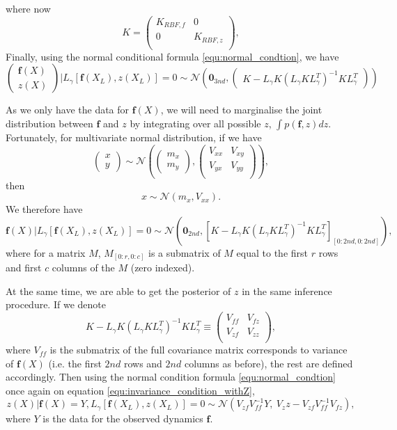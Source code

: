 \documentclass{statsmsc}
\begin{document}
where now 
$$
K = \begin{pmatrix}
  K_{RBF, f} & 0 \\
  0 & K_{RBF, z}\\
\end{pmatrix},
$$
Finally, using the normal conditional formula \ref{equ:normal_condtion}, we have 
\begin{equation}
  \begin{pmatrix}\mathbf{f}(X) \\ z(X) \end{pmatrix}|L_\gamma[\mathbf{f}(X_L), z(X_L)]=0 \sim \mathcal{N} \left(\mathbf{0}_{3nd}, \begin{pmatrix}
    K-L_\gamma K(L_\gamma KL_\gamma^T)^{-1}KL_\gamma^T
  \end{pmatrix}\right)
  \label{equ:invariance_condition_withZ}
\end{equation}

As we only have the data for $\mathbf{f}(X)$, we will need to marginalise the joint distribution between $\mathbf{f}$ and $z$ by integrating over all possible $z$, $\int p(\mathbf{f},z) dz$.
Fortunately, for multivariate normal distribution, if we have
$$
\begin{pmatrix}
  x \\ y
\end{pmatrix}
\sim\mathcal{N}
\left(
  \begin{pmatrix}
    m_x \\ m_y 
  \end{pmatrix},
\begin{pmatrix}
  V_{xx} & V_{xy} \\ V_{yx} & V_{yy} \\
\end{pmatrix}
\right),
$$
then 
$$
x\sim\mathcal{N}(m_x, V_{xx}).
$$
We therefore have 
$$
\mathbf{f}(X)|L_\gamma[\mathbf{f}(X_L), z(X_L)]=0 \sim \mathcal{N}(\mathbf{0}_{2nd}, [K-L_\gamma K(L_\gamma KL_\gamma^T)^{-1}KL_\gamma^T]_{[0:2nd, 0:2nd]}),
$$
where for a matrix $M$, $M_{[0:r,0:c]}$ is a submatrix of $M$ equal to the first $r$ rows and first $c$ columns of the $M$ (zero indexed).

At the same time, we are able to get the posterior of $z$ in the same inference procedure. 
If we denote 
$$
K-L_\gamma K(L_\gamma KL_\gamma^T)^{-1}KL_\gamma^T \equiv \begin{pmatrix}
  V_{ff} & V_{fz} \\ V_{zf} & V_{zz} \\
\end{pmatrix},
$$
where $V_{ff}$ is the submatrix of the full covariance matrix corresponds to variance of $\mathbf{f}(X)$ (i.e. the first $2nd$ rows and $2nd$ columns as before), the rest are defined accordingly.  
Then using the normal condition formula \ref{equ:normal_condtion} once again on equation \ref{equ:invariance_condition_withZ}, 
$$
z(X)|\mathbf{f}(X)=Y, L_\gamma[\mathbf{f}(X_L), z(X_L)]=0
\sim\mathcal{N}
(V_{zf}V_{ff}^{-1}Y,\ V_zz-V_{zf}V_{ff}^{-1}V_{fz}),
$$
where $Y$ is the data for the observed dynamics $\mathbf{f}$.
\end{document}
